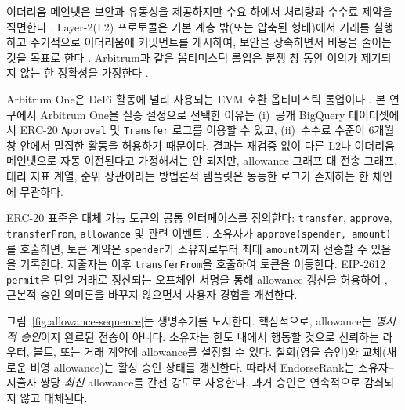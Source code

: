 
이더리움 메인넷은 보안과 유동성을 제공하지만 수요 하에서 처리량과 수수료 제약을 직면한다 . Layer-2(L2) 프로토콜은 기본 계층 밖(또는 압축된 형태)에서 거래를 실행하고 주기적으로 이더리움에 커밋먼트를 게시하여, 보안을 상속하면서 비용을 줄이는 것을 목표로 한다 . Arbitrum과 같은 옵티미스틱 롤업은 분쟁 창 동안 이의가 제기되지 않는 한 정확성을 가정한다 .

Arbitrum One은 DeFi 활동에 널리 사용되는 EVM 호환 옵티미스틱 롤업이다 . 본 연구에서 Arbitrum One을 실증 설정으로 선택한 이유는 (i)~공개 BigQuery 데이터셋에서 ERC-20 \texttt{Approval} 및 \texttt{Transfer} 로그를 이용할 수 있고, (ii)~수수료 수준이 6개월 창 안에서 밀집한 활동을 허용하기 때문이다. 결과는 재검증 없이 다른 L2나 이더리움 메인넷으로 자동 이전된다고 가정해서는 안 되지만, allowance 그래프 대 전송 그래프, 대리 지표 계열, 순위 상관이라는 방법론적 템플릿은 동등한 로그가 존재하는 한 체인에 무관하다.


ERC-20 표준은 대체 가능 토큰의 공통 인터페이스를 정의한다: \texttt{transfer}, \texttt{approve}, \texttt{transferFrom}, \texttt{allowance} 및 관련 이벤트 . 소유자가 \texttt{approve(spender, amount)}를 호출하면, 토큰 계약은 \texttt{spender}가 소유자로부터 최대 \texttt{amount}까지 전송할 수 있음을 기록한다. 지출자는 이후 \texttt{transferFrom}을 호출하여 토큰을 이동한다. EIP-2612 \texttt{permit}은 단일 거래로 정산되는 오프체인 서명을 통해 allowance 갱신을 허용하여 , 근본적 승인 의미론을 바꾸지 않으면서 사용자 경험을 개선한다.

그림~\ref{fig:allowance-sequence}는 생명주기를 도시한다. 핵심적으로, allowance는 \emph{명시적 승인}이지 완료된 전송이 아니다. 소유자는 한도 내에서 행동할 것으로 신뢰하는 라우터, 볼트, 또는 거래 계약에 allowance를 설정할 수 있다. 철회(영을 승인)와 교체(새로운 비영 allowance)는 활성 승인 상태를 갱신한다. 따라서 EndorseRank는 소유자--지출자 쌍당 \emph{최신} allowance를 간선 강도로 사용한다. 과거 승인은 연속적으로 감쇠되지 않고 대체된다.


